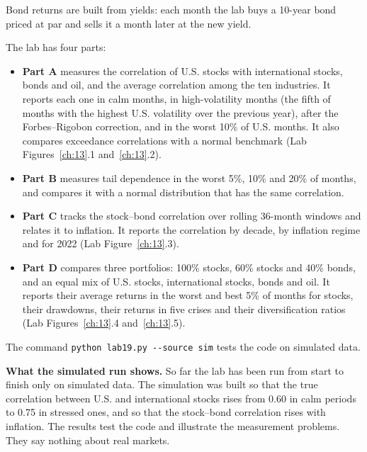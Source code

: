 Bond returns are built from yields: each month the lab buys a 10-year bond priced at par and sells it a month later at the new yield.

The lab has four parts:

\begin{itemize}
  \item \textbf{Part A} measures the correlation of U.S. stocks with international stocks, bonds and oil, and the average correlation among the ten industries. It reports each one in calm months, in high-volatility months (the fifth of months with the highest U.S. volatility over the previous year), after the Forbes--Rigobon correction, and in the worst 10\% of U.S. months. It also compares exceedance correlations with a normal benchmark (Lab Figures~\ref{ch:13}.1 and~\ref{ch:13}.2).
  \item \textbf{Part B} measures tail dependence in the worst 5\%, 10\% and 20\% of months, and compares it with a normal distribution that has the same correlation.
  \item \textbf{Part C} tracks the stock--bond correlation over rolling 36-month windows and relates it to inflation. It reports the correlation by decade, by inflation regime and for 2022 (Lab Figure~\ref{ch:13}.3).
  \item \textbf{Part D} compares three portfolios: 100\% stocks, 60\% stocks and 40\% bonds, and an equal mix of U.S. stocks, international stocks, bonds and oil. It reports their average returns in the worst and best 5\% of months for stocks, their drawdowns, their returns in five crises and their diversification ratios (Lab Figures~\ref{ch:13}.4 and~\ref{ch:13}.5).
\end{itemize}

The command \texttt{python lab19.py -{}-source sim} tests the code on simulated data.

\textbf{What the simulated run shows.} So far the lab has been run from start to finish only on simulated data. The simulation was built so that the true correlation between U.S. and international stocks rises from 0.60 in calm periods to 0.75 in stressed ones, and so that the stock--bond correlation rises with inflation. The results test the code and illustrate the measurement problems. They say nothing about real markets.

